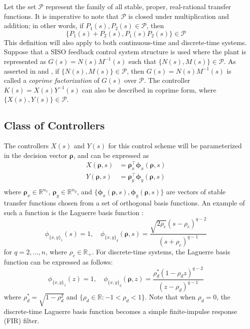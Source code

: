 \documentclass[letterpaper, 10 pt, conference]{ieeeconf}  %
\begin{document}
Let the set $\mathscr{P}$ represent the family of all stable, proper, real-rational transfer functions. It is imperative to note that $\mathscr{P}$ is closed under multiplication and addition; in other words, if $P_1(s),P_2(s) \in \mathscr{P}$, then 
\begin{equation}
\{ P_1(s)+P_2(s),P_1(s)P_2(s)\} \in \mathscr{P}
\end{equation}
This definition will also apply to both continuous-time and discrete-time systems. Suppose that a SISO feedback control system structure is used where the plant is represented as $G(s) = N(s)M^{-1}(s)$ such that $\{N(s),M(s)\} \in \mathscr{P}$. As asserted in \cite{ZD98} and \cite{DFT92}, if $\{N(s), M(s)\} \in \mathscr{P}$, then $G(s) = N(s)M^{-1}(s)$ is called a \textit{coprime factorization} of $G(s)$ over $\mathscr{P}$. The controller $K(s) =X(s)Y^{-1}(s)$ can also be described in coprime form, where $\{X(s), Y(s)\} \in \mathscr{P}$.


\subsection{Class of Controllers}
The controllers $X(s)$ and $Y(s)$ for this control scheme will be parameterized in the decision vector $\bm{\rho}$, and can be expressed as
\begin{equation}
\begin{aligned} \label{eq:cont}
X(\bm{\rho},s) &= \bm{\rho}_x^{\top} \bm{\phi}_x(\bm{\rho},s)\\
Y(\bm{\rho},s) &= \bm{\rho}_y^{\top} \bm{\phi}_y(\bm{\rho},s)\\
\end{aligned}
\end{equation}
where $\bm{\rho}_x \in \mathbb{R}^{n_x}$, $\bm{\rho}_y \in \mathbb{R}^{n_y}$, and $\{\bm{\phi}_x(\bm{\rho},s), \bm{\phi}_y(\bm{\rho},s)\}$ are vectors of stable transfer functions chosen from a set of orthogonal basis functions. An example of such a function is the Laguerre basis function \cite{Kar13}:
\begin{equation} \label{eq:Laguerre}
\phi_{\{x,y\}_1}(s)=1,\quad \phi_{\{x,y\}_q}(\bm{\rho},s) = \frac{\sqrt{2 \rho_c}(s-\rho_c)^{q-2}}{(s+\rho_c)^{q-1}}
\end{equation}
for $q = 2,\ldots,n$, where $\rho_c \in \mathbb{R}_+$. For discrete-time systems, the Laguerre basis function can be expressed as follows:
\begin{equation} \label{eq:Laguerre_z}
\phi_{\{x,y\}_1}(z)=1,\quad \phi_{\{x,y\}_q}(\bm{\rho},z) = \frac{\rho_d^*(1-\rho_d z)^{q-2}}{(z-\rho_d)^{q-1}}
\end{equation}
where $\rho_d^* = \sqrt{1-\rho_d^2}$ and $\{\rho_d \in \mathbb{R}: -1 < \rho_d < 1\}$. Note that when $\rho_d = 0$, the discrete-time Laguerre basis function becomes a simple finite-impulse response (FIR) filter.
\end{document}
